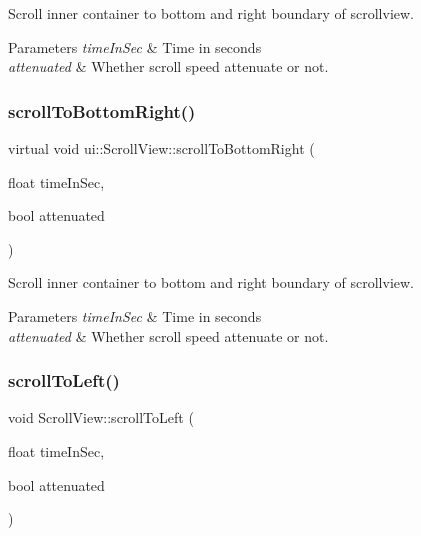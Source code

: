 Scroll inner container to bottom and right boundary of scrollview. 
\begin{DoxyParams}{Parameters}
{\em time\+In\+Sec} & Time in seconds \\
\hline
{\em attenuated} & Whether scroll speed attenuate or not. \\
\hline
\end{DoxyParams}
\mbox{\label{classui_1_1ScrollView_ab76f77e635b16c4aeaa36586d286a7ba}} 
\subsubsection{\texorpdfstring{scroll\+To\+Bottom\+Right()}{scrollToBottomRight()}\hspace{0.1cm}{\footnotesize\ttfamily [2/2]}}
{\footnotesize\ttfamily virtual void ui\+::\+Scroll\+View\+::scroll\+To\+Bottom\+Right (\begin{DoxyParamCaption}\item[{float}]{time\+In\+Sec,  }\item[{bool}]{attenuated }\end{DoxyParamCaption})\hspace{0.3cm}{\ttfamily [virtual]}}

Scroll inner container to bottom and right boundary of scrollview. 
\begin{DoxyParams}{Parameters}
{\em time\+In\+Sec} & Time in seconds \\
\hline
{\em attenuated} & Whether scroll speed attenuate or not. \\
\hline
\end{DoxyParams}
\mbox{\label{classui_1_1ScrollView_a363815ef6b3de5fc4c5d913a9c954c20}} 
\subsubsection{\texorpdfstring{scroll\+To\+Left()}{scrollToLeft()}\hspace{0.1cm}{\footnotesize\ttfamily [1/2]}}
{\footnotesize\ttfamily void Scroll\+View\+::scroll\+To\+Left (\begin{DoxyParamCaption}\item[{float}]{time\+In\+Sec,  }\item[{bool}]{attenuated }\end{DoxyParamCaption})\hspace{0.3cm}{\ttfamily [virtual]}}


